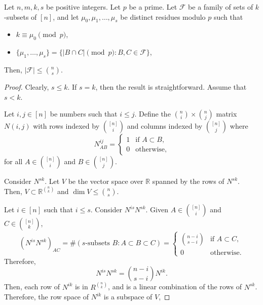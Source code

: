 \begin{theorem} \label{thm:frankl-wilson}
    Let \(n, m, k, s\) be positive integers.
    Let \(p\) be a prime.
    Let \(\mathcal{F}\) be a family of sets of \(k\)-subsets of \([n]\),
    and let \(\mu_0, \mu_1, \dots, \mu_s\) be distinct residues modulo \(p\)
    such that
    \begin{itemize}
        \item \(k \equiv \mu_0 \pmod{p}\),
        \item \(\{\mu_1, \dots, \mu_s\} = \{|B \cap C| \pmod{p} : B, C \in \mathcal{F}\}\),
    \end{itemize}
    Then, \(|\mathcal{F}| \leq \binom{n}{s}\).
\end{theorem}

\begin{proof}
    Clearly, \(s \leq k\). If \(s = k\), then the result is straightforward.
    Assume that \(s < k\).

    Let \(i, j \in [n]\) be numbers such that \(i \leq j\).
    Define the \(\binom{n}{i} \times \binom{n}{j}\) matrix \(N(i, j)\)
    with rows indexed by \(\binom{[n]}{i}\)
    and columns indexed by \(\binom{[n]}{j}\)
    where
    \begin{equation}
        N^{ij}_{AB} =
        \begin{cases}
            1 & \text{if } A \subset B, \\
            0 & \text{otherwise},
        \end{cases}
    \end{equation}
    for all \(A \in \binom{[n]}{i}\) and \(B \in \binom{[n]}{j}\).

    Consider \(N^{sk}\).
    Let \(V\) be the vector space over \(\mathbb{R}\) spanned by the rows of \(N^{sk}\).
    Then, \(V \subset \mathbb{R}^{\binom{n}{k}}\) and \(\dim V \leq \binom{n}{s}\).

    Let \(i \in [n]\) such that \(i \leq s\).
    Consider \( N^{is} N^{sk} \).
    Given \(A \in \binom{[n]}{i}\) and \(C \in \binom{[n]}{k}\),
    \begin{equation}
        (N^{is} N^{sk})_{AC} =
        \#
        \left(
            \text{\(s\)-subsets } B : A \subset B \subset C
        \right)
        =
        \begin{cases}
            \binom{n-i}{s-i} & \text{if } A \subset C, \\
            0 & \text{otherwise}.
        \end{cases}
    \end{equation}
    Therefore,
    \begin{equation}
        N^{is} N^{sk} = \binom{n-i}{s-i} N^{ik}.
    \end{equation}
    Then, each row of \(N^{ik}\) is in \(R^{\binom{n}{k}}\),
    and is a linear combination of the rows of \(N^{sk}\).
    Therefore, the row space of \(N^{ik}\) is a subspace of \(V\),


\end{proof}
